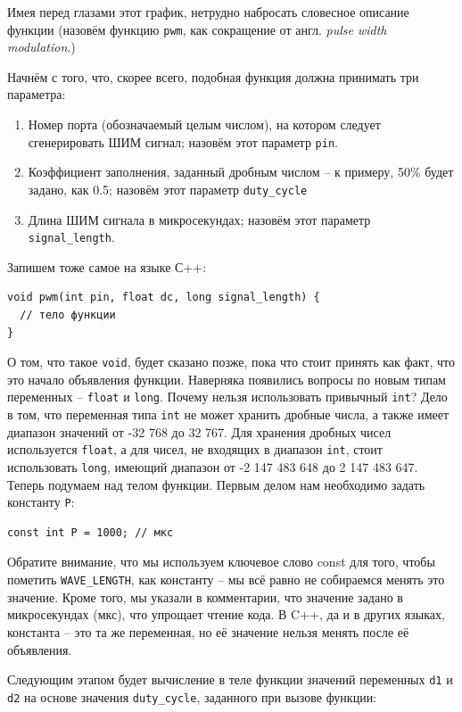 \documentclass[a4paper,twoside]{book}
\begin{document}
Имея перед глазами этот график, нетрудно набросать словесное описание функции
(назовём функцию \texttt{pwm}, как сокращение от англ. \emph{pulse width
  modulation}.)

Начнём с того, что, скорее всего, подобная функция должна принимать три
параметра:
\begin{enumerate}
\item Номер порта (обозначаемый целым числом), на котором следует сгенерировать
  ШИМ сигнал; назовём этот параметр \texttt{pin}.
\item Коэффициент заполнения, заданный дробным числом -- к примеру, 50\% будет
  задано, как 0.5; назовём этот параметр \texttt{duty\_cycle}
\item Длина ШИМ сигнала в микросекундах; назовём этот параметр
  \texttt{signal\_length}.
\end{enumerate}

Запишем тоже самое на языке С++:

\begin{verbatim}
void pwm(int pin, float dc, long signal_length) {
  // тело функции
}
\end{verbatim}

О том, что такое \texttt{void}, будет сказано позже, пока что стоит принять как
факт, что это начало объявления функции. Наверняка появились вопросы по новым
типам переменных -- \texttt{float} и \texttt{long}. Почему нельзя использовать
привычный \texttt{int}? Дело в том, что переменная типа \texttt{int} не может
хранить дробные числа, а также имеет диапазон значений от -32 768 до 32 767. Для
хранения дробных чисел используется \texttt{float}, а для чисел, не входящих в
диапазон \texttt{int}, стоит использовать \texttt{long}, имеющий диапазон от -2
147 483 648 до 2 147 483 647. Теперь подумаем над телом функции. Первым делом
нам необходимо задать константу \texttt{P}:

\begin{verbatim}
const int P = 1000; // мкс
\end{verbatim}

Обратите внимание, что мы используем ключевое слово const для того, чтобы
пометить \texttt{WAVE\_LENGTH}, как константу -- мы всё равно не собираемся
менять это значение. Кроме того, мы указали в комментарии, что значение задано в
микросекундах (мкс), что упрощает чтение кода. В C++, да и в других языках,
константа -- это та же переменная, но её значение нельзя менять после её
объявления.

Следующим этапом будет вычисление в теле функции значений переменных \texttt{d1}
и \texttt{d2} на основе значения \texttt{duty\_cycle}, заданного при вызове
функции:
\end{document}
